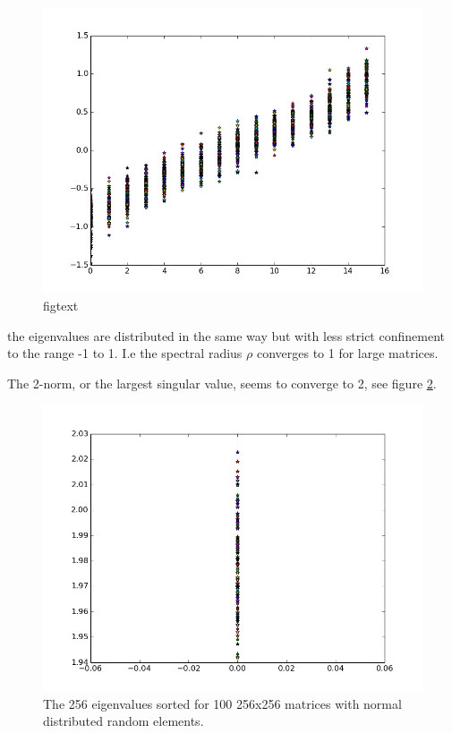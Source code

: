 \message{ !name(assignment4.tex)}\documentclass[a4paper]{article}
\begin{document}
\begin{enumerate}
\begin{figure}
\centering
\includegraphics[scale=0.3]{task1_a_2.jpeg}
\caption{\label{fig: t1a2}figtext}
\end{figure} 
the eigenvalues are distributed in the same way but with less strict confinement to the range -1 to 1. I.e the spectral radius $\rho$ converges to 1 for large matrices.

The 2-norm, or the largest singular value, seems to converge to 2, see figure \ref{fig: t1b1}.

\begin{figure}
\centering
\includegraphics[scale=0.3]{task1_b_1.jpeg}
\caption{\label{fig: t1b1}The 256 eigenvalues sorted for 100 256x256 matrices with normal distributed random elements.}
\end{figure} 


\end{enumerate}
\end{document}
